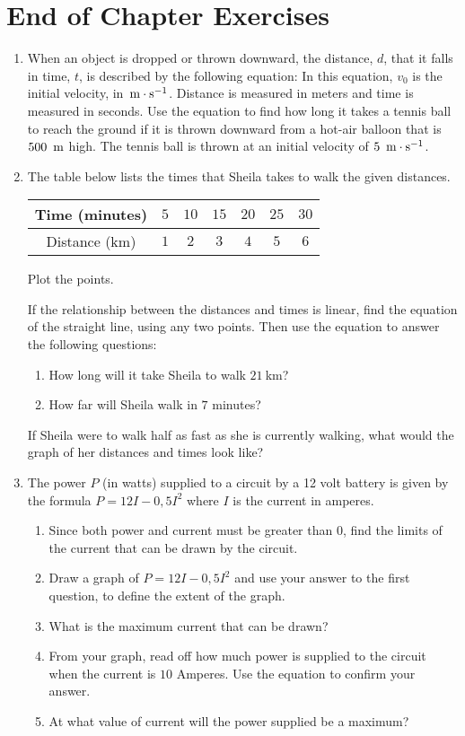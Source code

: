 \section{End of Chapter Exercises}
\begin{enumerate}
\item{When an object is dropped or thrown downward, the distance, $d$, that it falls in time, $t$, is described by the following equation:
In this equation, $v_0$ is the initial velocity, in $\,\mathrm{m \cdot s^{-1}}$. Distance is measured in meters and time is measured in seconds. Use the equation to find how long it takes a tennis ball to reach the ground if it is thrown downward from a hot-air balloon that is $500~\,\rm{m}$ high. The tennis ball is thrown at an initial velocity of $5~\,\mathrm{m \cdot s^{-1}}$.}

\item{The table below lists the times that Sheila takes to walk the given distances.
\begin{center}
\begin{tabular}{|c|c|c|c|c|c|c|}\hline
Time (minutes)& $5$ & $10$ & $15$ &$20$ &$25$ &$30$\\\hline
Distance (km)& $1$ & $2$ & $3$ & $4$ & $5$ &$6$\\\hline
\end{tabular}
\end{center}

Plot the points.

If the relationship between the distances and times is linear, find the equation of the straight line, using any two points. Then use the equation to answer the following questions:
\begin{enumerate}
\item How long will it take Sheila to walk $21~$km?
\item How far will Sheila walk in $7$ minutes?
\end{enumerate}
If Sheila were to walk half as fast as she is currently walking, what would the graph of her distances and times look like?}

\item{The power $P$ (in watts) supplied to a circuit by a 12 volt battery is given by the formula $P = 12I - 0,5I^2$ where $I$ is the current in amperes.
\begin{enumerate}
\item{Since both power and current must be greater than $0$, find the limits of the current that can be drawn by the circuit.}
\item{Draw a graph of $P = 12I - 0,5I^2$ and use your answer to the first question, to define the extent of the graph.}
\item{What is the maximum current that can be drawn?}
\item{From your graph, read off how much power is supplied to the circuit when the current is $10$ Amperes. Use the equation to confirm your answer.}
\item{At what value of current will the power supplied be a maximum?}
\end{enumerate}
}


\end{enumerate}
